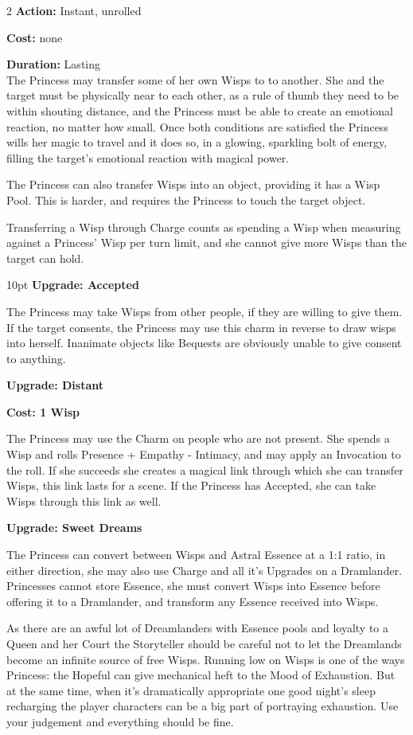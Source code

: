 \begin{multicols}{2}
\noindent \textbf{Action:} Instant, unrolled

\noindent \textbf{Cost:} none

\noindent \textbf{Duration:} Lasting \\

\noindent The Princess may transfer some of her own Wisps to to another. She and the target must be physically near to each other, as a rule of thumb they need to be within shouting distance, and the Princess must be able to create an emotional reaction, no matter how small. Once both conditions are satisfied the Princess wills her magic to travel and it does so, in a glowing, sparkling bolt of energy, filling the target's emotional reaction with magical power. 

The Princess can also transfer Wisps into an object, providing it has a Wisp Pool. This is harder, and requires the Princess to touch the target object. 

Transferring a Wisp through Charge counts as spending a Wisp when measuring against a Princess' Wisp per turn limit, and she cannot give more Wisps than the target can hold.

\begin{myindentpar}{10pt} \textbf{Upgrade: Accepted}

The Princess may take Wisps from other people, if they are willing to give them. If the target consents, the Princess may use this charm in reverse to draw wisps into herself. Inanimate objects like Bequests are obviously unable to give consent to anything. 

\textbf{Upgrade: Distant}

\textbf{Cost: 1 Wisp}

\noindent The Princess may use the Charm on people who are not present. She spends a Wisp and rolls Presence + Empathy - Intimacy, and may apply an Invocation to the roll. If she succeeds she creates a magical link through which she can transfer Wisps, this link lasts for a scene. If the Princess has Accepted, she can take Wisps through this link as well. 

\textbf{Upgrade: Sweet Dreams}

The Princess can convert between Wisps and Astral Essence at a 1:1 ratio, in either direction, she may also use Charge and all it's Upgrades on a Dramlander. Princesses cannot store Essence, she must convert Wisps into Essence before offering it to a Dramlander, and transform any Essence received into Wisps.

As there are an awful lot of Dreamlanders with Essence pools and loyalty to a Queen and her Court the Storyteller should be careful not to let the Dreamlands become an infinite source of free Wisps. Running low on Wisps is one of the ways Princess: the Hopeful can give mechanical heft to the Mood of Exhaustion. But at the same time, when it's dramatically appropriate one good night's sleep recharging the player characters can be a big part of portraying exhaustion. Use your judgement and everything should be fine. 


\end{myindentpar}
\end{multicols}
